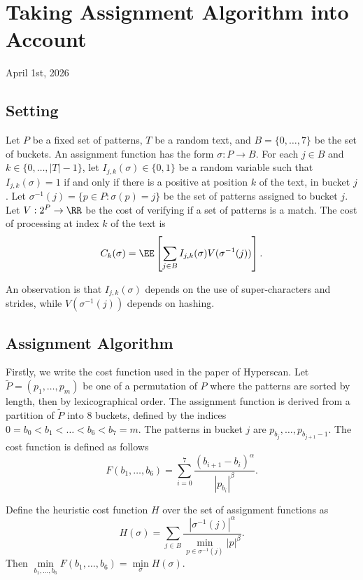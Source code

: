 \chapter{Taking Assignment Algorithm into Account}

\begin{center}
  April 1st, 2026
  \vspace{0.5cm}
\end{center}

\section{Setting}
Let $P$ be a fixed set of patterns, $T$ be a random text, and $B=\{0,\ldots,7\}$ be the set of buckets. An assignment function has the form $\sigma: P \to B$. For each $j\in B$ and $k\in\{0,\ldots,|T|-1\}$, let $I_{j,k}(\sigma)\in\{0,1\}$ be a random variable such that $I_{j,k}(\sigma) = 1$ if and only if there is a positive at position $k$ of the text, in bucket $j$. Let $\sigma^{-1}(j) = \{p \in P : \sigma(p) = j\}$ be the set of patterns assigned to bucket $j$. Let $V: 2^P\to\RR$ be the cost of verifying if a set of patterns is a match. The cost of processing at index $k$ of the text is
$$C_k(\sigma) = \EE\left[\sum\limits_{j\in B} I_{j,k}(\sigma) V(\sigma^{-1}(j))\right].$$

An observation is that $I_{j,k}(\sigma)$ depends on the use of super-characters and strides, while $V(\sigma^{-1}(j))$ depends on hashing.


\section{Assignment Algorithm}

Firstly, we write the cost function used in the paper of Hyperscan. Let $\tilde{P}=(p_1,\ldots, p_m)$ be one of a permutation of $P$ where the patterns are sorted by length, then by lexicographical order. The assignment function is derived from a partition of $\tilde{P}$ into 8 buckets, defined by the indices $0=b_0 < b_1 < \ldots < b_6 < b_7 = m$. The patterns in bucket $j$ are $p_{b_j},\ldots, p_{b_{j+1}-1}$. The cost function is defined as follows
$$F(b_1,\ldots, b_6) = \sum_{i=0}^{7}\dfrac{(b_{i+1}-b_{i})^\alpha}{|p_{b_{i}}|^\beta}.$$

\begin{proposition}
  Define the heuristic cost function $H$ over the set of assignment functions as
  $$H(\sigma) = \sum_{j\in B}\dfrac{|\sigma^{-1}(j)|^\alpha}{\min\limits_{p \in \sigma^{-1}(j)} |p|^\beta}.$$
  Then $\min\limits_{b_1,\ldots,b_6}F(b_1,\ldots, b_6) = \min\limits_{\sigma} H(\sigma).$
\end{proposition}


